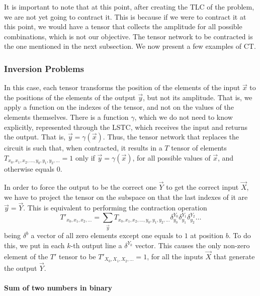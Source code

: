 It is important to note that at this point, after creating the TLC of the problem, we are not yet going to contract it. This is because if we were to contract it at this point, we would have a tensor that collects the amplitude for all possible combinations, which is not our objective. The tensor network to be contracted is the one mentioned in the next subsection. We now present a few examples of CT.


\subsubsection{Inversion Problems}
In this case, each tensor transforms the position of the elements of the input $\vec{x}$ to the positions of the elements of the output $\vec{y}$, but not its amplitude. That is, we apply a function on the indexes of the tensor, and not on the values of the elements themselves. There is a function $\gamma$, which we do not need to know explicitly, represented through the LSTC, which receives the input and returns the output. That is, $\vec{y}=\gamma(\vec{x})$. Thus, the tensor network that replaces the circuit is such that, when contracted, it results in a $T$ tensor of elements $T_{x_0,x_1,x_2,\dots, y_0, y_1, y_2, \dots}=1$ only if $\vec{y}=\gamma(\vec{x})$, for all possible values of $\vec{x}$, and otherwise equals $0$. 

In order to force the output to be the correct one $\vec{Y}$ to get the correct input $\vec{X}$, we have to project the tensor on the subspace on that the last indexes of it are $\vec{y}=\vec{Y}$. This is equivalent to performing the contraction operation
\begin{equation}
    T'_{x_0,x_1,x_2,\dots} = \sum_{\vec{y}} T_{x_0,x_1,x_2,\dots, y_0, y_1, y_2, \dots}\delta^{Y_0}_{y_0}\delta^{Y_1}_{y_1}\delta^{Y_2}_{y_2}\dots
\end{equation}
being $\delta^{b}$ a vector of all zero elements except one equals to $1$ at position $b$. To do this, we put in each $k$-th output line a $\delta^{Y_k}$ vector. This causes the only non-zero element of the $T'$ tensor to be $T'_{X_0,X_1,X_2,\dots}=1$, for all the inputs $\vec{X}$ that generate the output $\vec{Y}$.



\paragraph{Sum of two numbers in binary}
$ $

